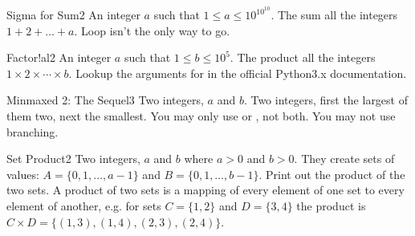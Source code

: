 \begin{task}{Sigma for Sum}{2}
\In
An integer $a$ such that $1 \leq a \leq 10^{10^{10}}$.
\Out
The sum all the integers $1 + 2 + \dots + a$.
\Hint
Loop isn't the only way to go.
\end{task}

\begin{task}{Factor!al}{2}
\In
An integer $a$ such that $1 \leq b \leq 10^{5}$.
\Out
The product all the integers $1 \times 2 \times \cdots \times b$.
\Hint
Lookup the arguments for  in the official Python3.x documentation.
\end{task}

\begin{task}{Minmaxed 2: The Sequel}{3}
\In
Two integers, $a$ and $b$.
\Out
Two integers, first the largest of them two, next the smallest.
\Note
You may  only use  or , not both. You may not use branching.
\end{task}

\begin{task}{Set Product}{2}
\In
Two integers, $a$ and $b$ where $a > 0$ and $b > 0$. They create sets of values:
$A = \{0, 1, \dots, a - 1\}$ and $B = \{0, 1, \dots, b - 1\}$.
\Out
Print out the product of the two sets.
\Note
A product of two sets is a mapping of every element of one set to every element
of another, e.g. for sets $C = \{1, 2\}$ and $D = \{3, 4\}$ the product is
$C \times D = \{(1, 3), (1, 4), (2, 3), (2, 4)\}$.
\end{task}

